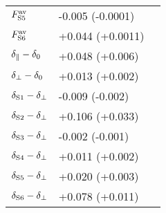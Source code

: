 \begin{table}[htbp]
\begin{tabular}{lll}
    $\FSAv[5]$           &  -0.005 (-0.0001)                           \\
    $\FSAv[6]$           &  +0.044 (+0.0011)                           \\
    \hline
    $\delpar-\delzero$   &  +0.048 (+0.006)                            \\
    $\delperp-\delzero$  &  +0.013 (+0.002)                            \\
    $\delS[1]-\delperp$  &  -0.009 (-0.002)                            \\
    $\delS[2]-\delperp$  &  +0.106 (+0.033)                            \\
    $\delS[3]-\delperp$  &  -0.002 (-0.001)                            \\
    $\delS[4]-\delperp$  &  +0.011 (+0.002)                            \\
    $\delS[5]-\delperp$  &  +0.020 (+0.003)                            \\
    $\delS[6]-\delperp$  &  +0.078 (+0.011)                            \\
    \hline
  \end{tabular}
\end{table}
